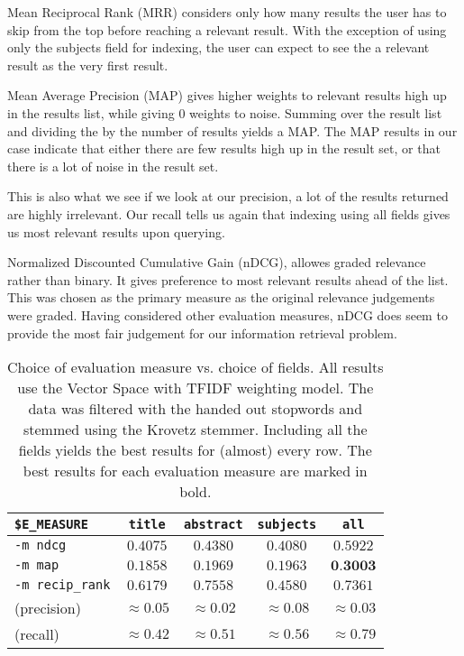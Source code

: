 Mean Reciprocal Rank (MRR) considers only how many results the user has to skip
from the top before reaching a relevant result. With the exception of using
only the subjects field for indexing, the user can expect to see the a relevant
result as the very first result.

Mean Average Precision (MAP) gives higher weights to relevant results high up
in the results list, while giving 0 weights to noise. Summing over the result
list and dividing the by the number of results yields a MAP. The MAP results in
our case indicate that either there are few results high up in the result set,
or that there is a lot of noise in the result set.

This is also what we see if we look at our precision, a lot of the results
returned are highly irrelevant. Our recall tells us again that indexing using
all fields gives us most relevant results upon querying.

Normalized Discounted Cumulative Gain (nDCG), allowes graded relevance rather
than binary. It gives preference to most relevant results ahead of the list.
This was chosen as the primary measure as the original relevance judgements
were graded. Having considered other evaluation measures, nDCG does seem to
provide the most fair judgement for our information retrieval problem.

\begin{table}[h!]
\centering
\begin{tabular}{lcccc}
\lstinline|$E_MEASURE| & \lstinline$title$ & \lstinline$abstract$ &
    \lstinline$subjects$ & \lstinline$all$ \\
\hline
\lstinline$-m ndcg$ & $0.4075$ & $0.4380$ & $0.4080$ & $\mathbf{0.5922}$ \\
\lstinline$-m map$ & $0.1858$ & $0.1969$ & $0.1963$ & $\textbf{0.3003}$ \\
\lstinline$-m recip_rank$ & $0.6179$ & $\mathbf{0.7558}$ & $0.4580$ & $0.7361$ \\
(precision) & $\approx 0.05$ & $\approx 0.02$ & $\mathbf{\approx 0.08}$ & $\approx 0.03$ \\
(recall) & $\approx 0.42$ & $\approx 0.51$ & $\approx 0.56$ & $\mathbf{\approx 0.79}$ \\
\hline
\end{tabular}
\caption[]{Choice of evaluation measure vs. choice of fields. All results use
the Vector Space with TFIDF weighting model. The data was filtered with the
handed out stopwords and stemmed using the Krovetz stemmer.  Including all the
fields yields the best results for (almost) every row. The best results for
each evaluation measure are marked in bold.}
\label{table:evaluation-measure-vs-fields}
\end{table}

